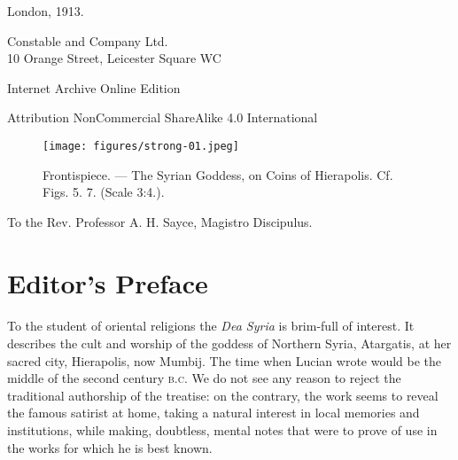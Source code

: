 \documentclass[a4paper, 11pt, oneside, polutonikogreek, english]{article}
\begin{document}
\begin{titlepage}
	
	
		
	\vspace*{\fill}%
	
	London, 1913.  %
	
	{\small Constable and Company Ltd.\\10 Orange Street, Leicester Square WC} %

	\vspace{1\baselineskip} %

        Internet Archive Online Edition  %
	
	{\small Attribution NonCommercial ShareAlike 4.0 International } %
\end{titlepage}
\clearpage
\setlength{\parskip}{1mm plus1mm minus1mm}
\tableofcontents
\clearpage
\begin{figure}[H]
\centering
\texttt{[image: figures/strong-01.jpeg]}
\caption*{Frontispiece. --- The Syrian Goddess, on Coins of Hierapolis. Cf. Figs. 5. 7. (Scale 3:4.).}
\end{figure}
\clearpage
\vspace*{\fill}
\begin{center}
To the Rev. Professor A. H. Sayce, Magistro Discipulus.
\end{center}
\vspace*{\fill}
\clearpage
\section*{Editor's Preface}
\paragraph{}
To the student of oriental religions the \emph{Dea Syria} is brim-full of interest. It describes the cult and worship of the goddess of Northern Syria, Atargatis, at her sacred city, Hierapolis, now Mumbij. The time when Lucian wrote would be the middle of the second century \textsc{b.c.} We do not see any reason to reject the traditional authorship of the treatise: on the contrary, the work seems to reveal the famous satirist at home, taking a natural interest in local memories and institutions, while making, doubtless, mental notes that were to prove of use in the works for which he is best known.
\end{document}
